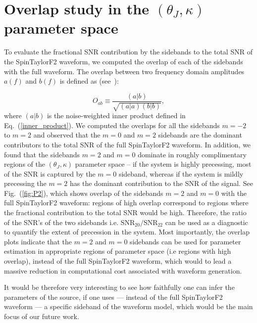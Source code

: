 \section{Overlap study in the $(\theta_J, \kappa)$ parameter space}
To evaluate the fractional SNR contribution by the sidebands to the total SNR of
the SpinTaylorF2 waveform,  we computed the overlap of each of the sidebands
with the full waveform. The overlap between two frequency domain amplitudes
$a(f)$ and $b(f)$ is defined as (see~\cite{Lundgren2014}):

\begin{equation} 
O_{ab} \equiv \dfrac{(a|b)}{\sqrt{(a|a)(b|b)}},
\end{equation} 
where $(a|b)$ is the noise-weighted inner product defined in
Eq.~(\ref{inner_product}). We computed the overlaps for all the sidebands $m=-2$
to $m=2$ and observed that the $m=0$ and  $m=2$ sidebands are the dominant
contributors to the total SNR of the full SpinTaylorF2 waveform. In addition, we
found  that the sidebands $m=2$ and $m=0$ dominate in roughly complimentary
regions of the  $(\theta_J, \kappa)$ parameter space -- if the system is highly
precessing, most of the SNR is captured by the $m=0$ sideband, whereas if the
system is mildly precessing the $m=2$ has the dominant contribution to the SNR of
the signal. See Fig.~(\ref{fig:P2}), which shows overlap  of the sidebands $m=2$
and $m=0$ with the full SpinTaylorF2 waveform: regions of high overlap
correspond to regions where the fractional contribution  to the total SNR would
be high. Therefore, the ratio of the SNR's of the two sidebands i.e.
$\text{SNR}_{20}/\text{SNR}_{22}$ can be used as a diagnostic to quantify the
extent of precession in the system. Most importantly, the overlap plots indicate
that the $m=2$ and $m=0$ sidebands can be used for parameter estimation in
appropriate regions of parameter space (i.e regions with high overlap), instead
of the full SpinTaylorF2 waveform, which would to lead a massive reduction in
computational cost associated with waveform generation. 

It would be therefore very interesting to see how faithfully one can infer the parameters of the source, 
if one uses --- instead of the full SpinTaylorF2 waveform --- a specific sideband of the waveform model, 
which would be the main focus of our future work.

